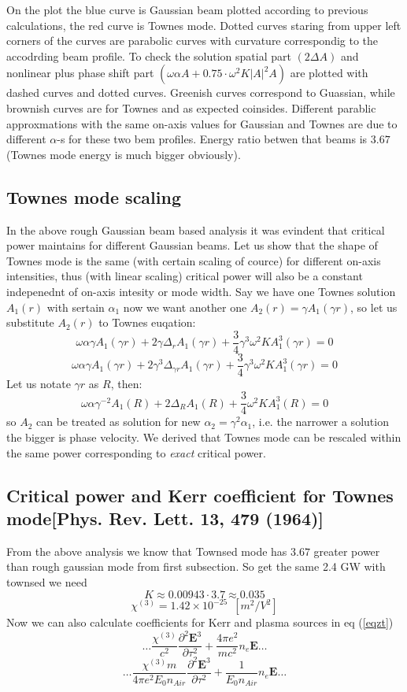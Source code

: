 \documentclass{article}
\newcommand{\dd}{\partial}
\newcommand{\ff}{\frac}
\newcommand{\vv}{\mathbf}
\newcommand{\chiT}{\chi^{(3)}}
\begin{document}
On the plot the blue curve is Gaussian beam plotted according to previous calculations, the red curve is Townes mode. Dotted curves staring from upper left corners of the curves are parabolic curves with curvature correspondig to the accodrding beam profile. To check the solution spatial part $(2 \Delta A)$ and nonlinear plus phase shift part $(\omega \alpha A + 0.75 \cdot \omega^2 K |A|^2 A )$ are plotted with dashed curves and dotted curves. Greenish curves correspond to Guassian, while brownish curves are for Townes and as expected coinsides. Different parablic approxmations with the same on-axis values for Gaussian and Townes are due to different $\alpha$-s for these two bem profiles. Energy ratio betwen that beams is $3.67$ (Townes mode energy is much bigger obviously).

\subsection{Townes mode scaling}
In the above rough Gaussian beam based analysis it was evindent that critical power maintains for different Gaussian beams. Let us show that the shape of Townes mode is the same (with certain scaling of cource) for different on-axis intensities, thus (with linear scaling) critical power will also be a constant indepenednt of on-axis intesity or mode width.
Say we have one Townes solution $A_1(r)$ with sertain $\alpha_1$ now we want another one $A_2(r) = \gamma A_1(\gamma r)$, so let us substitute $A_2(r)$ to Townes euqation:
\[ \omega \alpha \gamma A_1(\gamma r)  + 2 \gamma \Delta_r A_1(\gamma r)  + \ff{3}{4} \gamma^3 \omega^2 K A_1^3(\gamma r) = 0 \]
\[ \omega \alpha \gamma A_1(\gamma r)  + 2 \gamma^3 \Delta_{\gamma r} A_1(\gamma r)  + \ff{3}{4} \gamma^3 \omega^2 K A_1^3(\gamma r) = 0 \]
Let us notate $\gamma r$ as $R$, then:
\[ \omega \alpha \gamma^{-2} A_1(R)  + 2 \Delta_R A_1(R)  + \ff{3}{4} \omega^2 K A_1^3(R) = 0 \]
so $A_2$ can be treated as solution for new $\alpha_2 = \gamma^2 \alpha_1$, i.e. the narrower a solution the bigger is phase velocity. We derived that Townes mode can be rescaled within the same power corresponding to \textit{exact} critical power.

\subsection{Critical power and Kerr coefficient for Townes mode{[Phys. Rev. Lett. 13, 479 (1964)]}}
From the above analysis we know that Townsed mode has $3.67$ greater power than rough gaussian mode from first subsection. So get the same 2.4 GW with townsed we need
\[ K \approx 0.00943 \cdot 3.7 \approx 0.035 \]
\[ \chiT = 1.42 \times 10^{-25} \, \, \, \left[ m^2/V^2 \right] \]
Now we can also calculate coefficients for Kerr and plasma sources in eq (\ref{eqzt})
\[ \dots \ff{\chiT}{c^2}\ff{\dd^2 \vv E^3}{\dd \tau^2} + \ff{4\pi e^2}{m c^2} n_e \vv E \dots \]
\[ \dots \ff{\chiT m}{4\pi e^2 E_0 n_{Air}}\ff{\dd^2 \vv E^3}{\dd \tau^2} + \ff{1}{E_0 n_{Air}} n_e \vv E \dots \]
\end{document}
